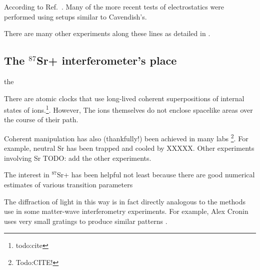 According to Ref.\ \cite{jackson}. Many of the more recent tests of electrostatics were performed using setups similar to Cavendish's. 

There are many other experiments along these lines as detailed in \cite{PhotonMassSurvey}. 

\subsection{The $^{87}$Sr+ interferometer's place}
the 


There are atomic clocks that use long-lived coherent superpositions of internal states of ions.\footnote{todo:cite}. However, The ions themselves do not enclose spacelike areas over the course of their path.

Coherent manipulation has also (thankfully!) been achieved in many labs \footnote{Todo:CITE!}. For example, neutral Sr has been trapped and cooled by XXXXX. 
Other experiments involving Sr TODO: add the other experiments.

The interest in $^{87}$Sr+ has been helpful not least because there are good numerical estimates of various transition parameters \cite{safronovaTheory}

The diffraction of light in this way is in fact directly analogous to the methods use in some matter-wave interferometry experiments. For example, Alex Cronin uses very small gratings to produce similar patterns \cite{Kronin_RMP}. 

